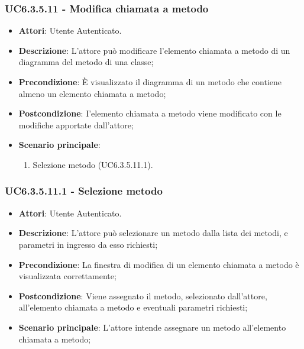 \subsubsection{UC6.3.5.11 - Modifica chiamata a metodo} 
\label{sssec:UC6.3.5.11} 
\begin{itemize} 
\item \textbf{Attori}: Utente Autenticato.
\item \textbf{Descrizione}: L'attore può modificare l'elemento chiamata a metodo di un diagramma del metodo di una classe;
\item \textbf{Precondizione}: È visualizzato il diagramma di un metodo che contiene almeno un elemento chiamata a metodo;
\item \textbf{Postcondizione}: I'elemento chiamata a metodo viene modificato con le modifiche apportate dall'attore;
\item \textbf{Scenario principale}: \begin{enumerate}\item Selezione metodo (UC6.3.5.11.1). 
 \end{enumerate}
\end{itemize} 
\subsubsection{UC6.3.5.11.1 - Selezione metodo} 
\label{sssec:UC6.3.5.11.1} 
\begin{itemize} 
\item \textbf{Attori}: Utente Autenticato.
\item \textbf{Descrizione}: L'attore può selezionare un metodo dalla lista dei metodi, e parametri in ingresso da esso richiesti;
\item \textbf{Precondizione}: La finestra di modifica di un elemento chiamata a metodo è visualizzata correttamente;
\item \textbf{Postcondizione}: Viene assegnato il metodo, selezionato dall'attore, all'elemento chiamata a metodo e eventuali parametri richiesti;
\item \textbf{Scenario principale}: L'attore intende assegnare un metodo all'elemento chiamata a metodo;\end{itemize} 
